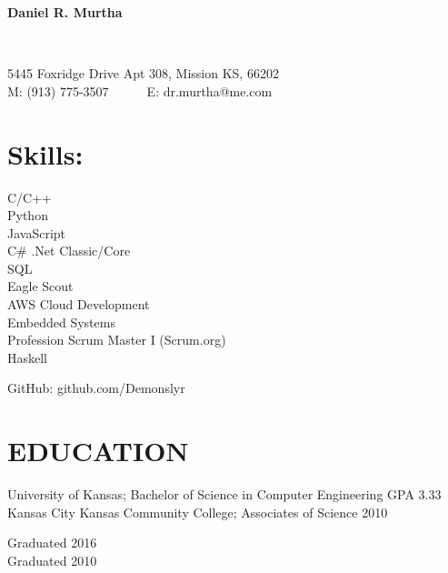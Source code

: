\documentclass{res}
\begin{document}
\begin{resume}
\begin{changemargin}{-0.5in}{0in}
	\begin{center}
		\begin{Huge}
		\textbf{Daniel R. Murtha}
		\end{Huge}
	\\
		\begin{normalsize}
			5445 Foxridge Drive Apt 308, Mission KS, 66202\\
			M: (913) 775-3507~~~~~~E: dr.murtha@me.com
		\end{normalsize}
	\end{center}
\end{changemargin}\vspace{-10pt}
\section{Skills:}
{\setlength\multicolsep{0pt}
\begin{multicols}{3}
C/C++\\Python\\JavaScript\\C\# .Net Classic/Core\\
\columnbreak %
SQL\\Eagle Scout\\AWS Cloud Development\\Embedded Systems\\Profession Scrum Master I (Scrum.org)\\Haskell
\columnbreak
	\begin{flushright}
	GitHub: github.com/Demonslyr\\
	\end{flushright}
\end{multicols}}\vspace{-10pt}
 
\section{EDUCATION}\vspace{5pt}
\begin{minipage}{0.8\linewidth}
	\begin{small}
		\begin{flushleft}
			University of Kansas; Bachelor of Science in Computer Engineering GPA 3.33\\Kansas City Kansas Community College; Associates of Science	2010
		\end{flushleft}
	\end{small}   
\end{minipage}
\begin{minipage}{0.2\linewidth}
	\begin{small}   
		\begin{flushright}
			Graduated 2016\\Graduated 2010
		\end{flushright}	     
	\end{small}   
\end{minipage}\vspace{-10pt}
 

\end{resume}
\end{document}
